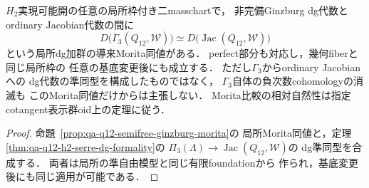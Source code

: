 \begin{corollary}
\label{cor:qa-q12-h2-ginzburg-jacobian-morita}
$H_2$実現可能開の任意の局所枠付き二masschartで，
非完備Ginzburg dg代数とordinary Jacobian代数の間に
\[
 D\bigl(\Gamma_3(Q_{12},\mathcal W)\bigr)
 \simeq
 D\bigl(\operatorname{Jac}(Q_{12},\mathcal W)\bigr)
 \tag{GJ}\label{eq:qa-q12-local-ginzburg-jacobian-derived}
\]
という局所dg加群の導来Morita同値がある．
perfect部分も対応し，幾何fiberと同じ局所枠の
任意の基底変更後にも成立する．
ただし$\Gamma_3$からordinary Jacobianへの
dg代数の準同型を構成したものではなく，
$\Gamma_3$自体の負次数cohomologyの消滅も
このMorita同値だけからは主張しない．
Morita比較の相対自然性は指定cotangent表示群oid上の定理に従う．
\end{corollary}
\begin{proof}
命題~\ref{prop:qa-q12-semifree-ginzburg-morita}の
局所Morita同値と，定理~
\ref{thm:qa-q12-h2-serre-dg-formality}の
$\Pi_3(\Lambda)\to
\operatorname{Jac}(Q_{12},\mathcal W)$の
dg準同型を合成する．
両者は局所の準自由模型と同じ有限foundationから
作られ，基底変更後にも同じ適用が可能である．
\end{proof}

